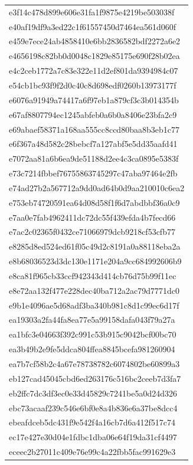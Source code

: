 \begin{tabular}{l}
e3f14c478d899e606e31fa1f9875e4219be503038f \\
e40af19df9a3ed22c1f61557450d7464ea561d060f \\
e459e7ece24ab4858410e6bb2836582bdf2272a6e2 \\
e4656198c82bb0d0048c1829e85175e690f28b02ea \\
e4c2ceb1772a7c83e322e11d2ef801da9394984c07 \\
e54cb1bc93f9f2d0c40c8d698edf0260b13973177f \\
e6076a91949a74417a6f97eb1a879cf3c3b014354b \\
e67af8807794ec1245abfeb0a6b0a8406e23bfa2c9 \\
e69abaef58371a168aa555cc8ccd80baa8b3eb1c77 \\
e6f367a48d582c28bebcf7a127abf5e5dd35aafd41 \\
e7072aa81a6b6ea9de51188d2ee4c3ca0895e5383f \\
e73c7214fbbef76755863745297c47aba97464e2fb \\
e74ad27b2a567712a9dd0ad64b0d9aa210010c6ea2 \\
e753eb74720591ea64d08d58f1f6d7abdbbf36a0c9 \\
e7aa0e7fab4962411dc72dc55f439efda4b7fecd66 \\
e7ac2c02365f0432ce71066979dcb9218cf53cfb77 \\
e8285d8ed524ed61f05c49d2c8191a0a88118eba2a \\
e8b68036523d3dc130e1171e204a9cc684992606b9 \\
e8ca81f965cb33ccf942343d414cb76d75b99f11ec \\
e8e72aa132f477e228dec40ba712a2ac79d7771dc0 \\
e9b1e4096ae5d68adf3ba340b981c8d1c99ec6d17f \\
ea19303a2fa44fa8ea77e5a99158dafa043f79a27a \\
ea1bfc3e04663f392c991c53b915c9042bcf00bc70 \\
ea3b49b2e9fe5ddca804ffea8845bcefa981260904 \\
ea7b7cf58b2c4a67e78738782c6074802be60899a3 \\
eb127cad45045cbd6ed263176c516bc2ceeb7d3fa7 \\
eb2ffc7dc3df3ec0e33d45829c7241be5a0d24d326 \\
ebc73acaaf239c546e6bf0e8a4b836e6a37be8dcc4 \\
ebeafdceb5dc431f9e542f4a16cb7d6a412f517c74 \\
ec17e427e30d04e1fdbc1dba06e64f19da31cf4497 \\
eceec2b27011c409e76e99c4a22fbb5fac991629e3 \\

\end{tabular}
